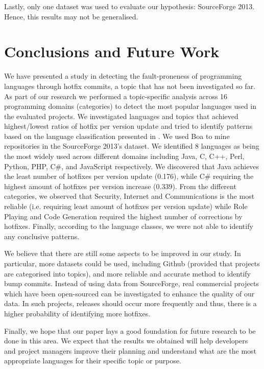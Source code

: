 \documentclass{sig-alternate}
\begin{document}
Lastly, only one dataset was used to evaluate our hypothesis: SourceForge 2013. Hence, this results may not be generalised.

\section{Conclusions and Future Work}
We have presented a study in detecting the fault-proneness of programming languages through hotfix commits, a topic that has not been investigated so far. As part of our research we performed a topic-specific analysis across 16 programming domains (categories) to detect the most popular languages used in the evaluated  projects. We investigated languages and topics that achieved highest/lowest ratios of hotfix per version update and tried to identify patterns based on the language classification presented in \cite{Ray2014}. We used Boa to mine repositories in the SourceForge 2013's dataset. %
We identified 8 languages as being the most widely used across different domains including Java, C, C++, Perl, Python, PHP, C\#, and JavaScript respectively. We discovered that Java achieves the least number of hotfixes per version update (0.176), while C\# requiring the highest amount of hotfixes per version increase (0.339). From the different categories, we observed that Security, Internet and Communications is the most reliable (i.e. requiring least amount of hotfixes per version update) while Role Playing and Code Generation required the highest number of corrections by hotfixes. Finally, according to the language classes, we were not able to identify any conclusive patterns.

We believe that there are still some aspects to be improved in our study. In particular, more datasets could be used, including Github (provided that projects are categorised into topics), and more reliable and accurate method to identify bump commits. Instead of using data from SourceForge, real commercial projects which have been open-sourced can be investigated to enhance the quality of our data. In such projects, releases should occur more frequently and thus, there is a higher probability of identifying more hotfixes.

Finally, we hope that our paper lays a good foundation for future research to be done in this area. We expect that the results we obtained will help developers and project managers improve their planning and understand what are the most appropriate languages for their specific topic or purpose.


 

\end{document}
